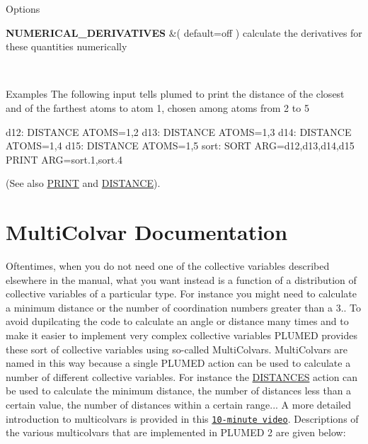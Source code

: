 \begin{DoxyParagraph}{Options}

\end{DoxyParagraph}
\begin{TabularC}{2}
\hline
{\bfseries  N\+U\+M\+E\+R\+I\+C\+A\+L\+\_\+\+D\+E\+R\+I\+V\+A\+T\+I\+V\+E\+S } &( default=off ) calculate the derivatives for these quantities numerically  

\\
\end{TabularC}


\begin{DoxyParagraph}{Examples}
The following input tells plumed to print the distance of the closest and of the farthest atoms to atom 1, chosen among atoms from 2 to 5 \begin{DoxyVerb}d12:  DISTANCE ATOMS=1,2
d13:  DISTANCE ATOMS=1,3
d14:  DISTANCE ATOMS=1,4
d15:  DISTANCE ATOMS=1,5
sort: SORT ARG=d12,d13,d14,d15
PRINT ARG=sort.1,sort.4
\end{DoxyVerb}
 (See also \hyperlink{PRINT}{P\+R\+I\+N\+T} and \hyperlink{DISTANCE}{D\+I\+S\+T\+A\+N\+C\+E}). 
\end{DoxyParagraph}
\hypertarget{mcolv}{}\section{Multi\+Colvar Documentation}\label{mcolv}
Oftentimes, when you do not need one of the collective variables described elsewhere in the manual, what you want instead is a function of a distribution of collective variables of a particular type. For instance you might need to calculate a minimum distance or the number of coordination numbers greater than a 3.. To avoid dupilcating the code to calculate an angle or distance many times and to make it easier to implement very complex collective variables P\+L\+U\+M\+E\+D provides these sort of collective variables using so-\/called Multi\+Colvars. Multi\+Colvars are named in this way because a single P\+L\+U\+M\+E\+D action can be used to calculate a number of different collective variables. For instance the \hyperlink{DISTANCES}{D\+I\+S\+T\+A\+N\+C\+E\+S} action can be used to calculate the minimum distance, the number of distances less than a certain value, the number of distances within a certain range... A more detailed introduction to multicolvars is provided in this \href{http://www.youtube.com/watch?v=iDvZmbWE5ps}{\tt 10-\/minute video}. Descriptions of the various multicolvars that are implemented in P\+L\+U\+M\+E\+D 2 are given below\+:

